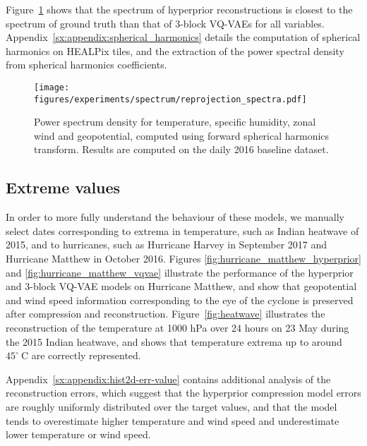 Figure~\ref{fig:spectra} shows that the spectrum of hyperprior reconstructions is closest to the spectrum of ground truth than that of 3-block VQ-VAEs for all variables.
Appendix~\ref{sx:appendix:spherical_harmonics} details the computation of spherical harmonics on HEALPix tiles, and the extraction of the power spectral density from spherical harmonics coefficients.

\begin{figure}
    \centering
    \texttt{[image: figures/experiments/spectrum/reprojection\_spectra.pdf]}
    \hfill
    \caption{Power spectrum density for temperature, specific humidity, zonal wind and geopotential, computed using forward spherical harmonics transform. Results are computed on the daily 2016 baseline dataset.}
    \label{fig:spectra}
\end{figure}


\subsection{Extreme values}

In order to more fully understand the behaviour of these models, we manually select dates corresponding to extrema in temperature, such as Indian heatwave of 2015, and to hurricanes, such as Hurricane Harvey in September 2017 and Hurricane Matthew in October 2016. Figures \ref{fig:hurricane_matthew_hyperprior} and \ref{fig:hurricane_matthew_vqvae} illustrate the performance of the hyperprior and 3-block VQ-VAE models on Hurricane Matthew, and show that geopotential and wind speed information corresponding to the eye of the cyclone is preserved after compression and reconstruction. Figure~\ref{fig:heatwave} illustrates the reconstruction of the temperature at 1000 hPa over 24 hours on 23 May during the 2015 Indian heatwave, and shows that temperature extrema up to around $45^\circ~\text{C}$ are correctly represented.

Appendix~\ref{sx:appendix:hist2d-err-value} contains additional analysis of the reconstruction errors, which suggest that the hyperprior compression model errors are roughly uniformly distributed over the target values, and that the model tends to overestimate higher temperature and wind speed and underestimate lower temperature or wind speed.

